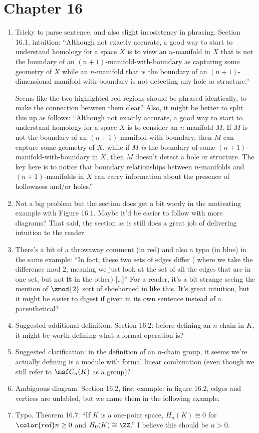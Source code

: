 \documentclass{fkletter}
\begin{document}
\section*{Chapter 16}
\begin{enumerate}
  \item Tricky to parse sentence, and also slight incosistency in phrasing.
    Section 16.1, intuition: ``Although not exactly accurate, a good way to
    start to understand homology for a space $X$ is to view an $n$-manifold in
    $X$ that is not the boundary of an
    {\color{red}$(n+1)$-manifold-with-boundary} as capturing some geometry of
    $X$ while an $n$-manifold that is the boundary of an
    {\color{red}$(n+1)$-dimensional manifold-with-boundary} is not detecting any
    hole or structure.''

    Seems like the two highlighted red regions should be phrased identically, to
    make the connection between them clear? Also, it might be better to split
    this up as follows: ``Although not exactly accurate, a good way to start to
    understand homology for a space $X$ is to consider an $n$-manifold $M$. If
    $M$ is not the boundary of an $(n+1)$-manifold-with-boundary, then $M$ can
    capture some geometry of $X$, while if $M$ \emph{is} the boundary of some
    $(n+1)$-manifold-with-boundary in $X$, then $M$ doesn't detect a hole or
    structure. The key here is to notice that boundary relationships between
    $n$-manifolds and $(n+1)$-manifolds in $X$ can carry information about the
    presence of hollowness and/or holes.''
  \item Not a big problem but the section does get a bit wordy in the motivating
    example with Figure 16.1. Maybe it'd be easier to follow with more diagrams?
    That said, the section as is still does a great job of delivering intuition
    to the reader.
  \item There's a bit of a throwaway comment (in red) and also a typo (in blue)
    in the same example: ``In fact, these two sets of edges differ ({\color{red}
      where we take the difference mod 2, meaning} we just look at the set of
    all the edges that are in one set, but not {\color{blue}\bfseries it} in the
    other) [\ldots]'' For a reader, it's a bit strange seeing the mention of
    $\zmod{2}$ sort of shoehorned in like this. It's great intuition, but it
    might be easier to digest if given in its own sentence instead of a
    parenthetical?
  \item Suggested additional definition. Section 16.2: before defining an
    $n$-chain in $K$, it might be worth defining what a formal operation is?
  \item Suggested clarification: in the definition of an $n$-chain group, it
    seems we're actually defining is a module with formal linear combination
    (even though we still refer to $\msf C_n(K)$ as a group)?
  \item Ambiguous diagram. Section 16.2, first example: in figure 16.2, edges
    and vertices are unlabled, but we name them in the following example.
  \item Typo. Theorem 16.7: ``If $K$ is a one-point space, $H_n(K) \cong 0$ for
    $\color{red} n \geq 0$ and $H_0(K) \cong \ZZ$.'' I believe this should be $n
    > 0$.
\end{enumerate}
\end{document}
